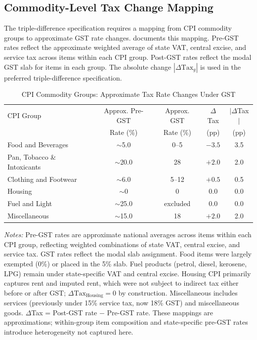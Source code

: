 \documentclass[12pt]{article}
\begin{document}
\subsection{Commodity-Level Tax Change Mapping}\label{app:taxmapping}

The triple-difference specification requires a mapping from CPI commodity groups to approximate GST rate changes.  documents this mapping. Pre-GST rates reflect the approximate weighted average of state VAT, central excise, and service tax across items within each CPI group. Post-GST rates reflect the modal GST slab for items in each group. The absolute change $|\Delta\text{Tax}_g|$ is used in the preferred triple-difference specification.

\begin{table}[htbp]
\centering
\caption{CPI Commodity Groups: Approximate Tax Rate Changes Under GST}
\label{tab:taxmap}
\begin{tabular}{lcccc}
\toprule
CPI Group & Approx. Pre-GST & Approx. GST & $\Delta$Tax & $|\Delta$Tax$|$ \\
& Rate (\%) & Rate (\%) & (pp) & (pp) \\
\midrule
Food and Beverages & $\sim$5.0 & 0--5 & $-3.5$ & 3.5 \\
Pan, Tobacco \& Intoxicants & $\sim$20.0 & 28 & $+2.0$ & 2.0 \\
Clothing and Footwear & $\sim$6.0 & 5--12 & $+0.5$ & 0.5 \\
Housing & $\sim$0 & 0 & 0.0 & 0.0 \\
Fuel and Light & $\sim$25.0 & excluded & 0.0 & 0.0 \\
Miscellaneous & $\sim$15.0 & 18 & $+2.0$ & 2.0 \\
\bottomrule
\end{tabular}
\begin{tablenotes}[flushleft]\small
\item \textit{Notes:} Pre-GST rates are approximate national averages across items within each CPI group, reflecting weighted combinations of state VAT, central excise, and service tax. GST rates reflect the modal slab assignment. Food items were largely exempted (0\%) or placed in the 5\% slab. Fuel products (petrol, diesel, kerosene, LPG) remain under state-specific VAT and central excise. Housing CPI primarily captures rent and imputed rent, which were not subject to indirect tax either before or after GST; $\Delta\text{Tax}_{\text{Housing}} = 0$ by construction. Miscellaneous includes services (previously under 15\% service tax, now 18\% GST) and miscellaneous goods. $\Delta$Tax = Post-GST rate $-$ Pre-GST rate. These mappings are approximations; within-group item composition and state-specific pre-GST rates introduce heterogeneity not captured here.
\end{tablenotes}
\end{table}
\end{document}

